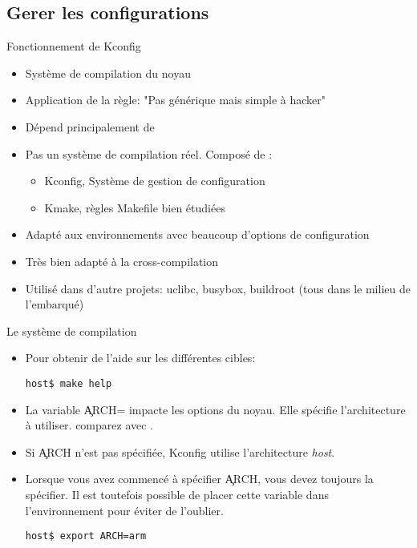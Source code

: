 \subsection{Gerer les configurations}
\begin{frame}[fragile=singleslide]{Fonctionnement de Kconfig}
  \begin{itemize}
  \item Système de compilation du noyau
  \item Application de la règle: "Pas générique mais simple à hacker"
  \item Dépend principalement de 
  \item  Pas un  système de  compilation réel. Composé de :
    \begin{itemize}
    \item Kconfig, Système de gestion de configuration
    \item Kmake, règles Makefile bien étudiées
    \end{itemize}
  \item   Adapté  aux  environnements   avec  beaucoup   d'options  de
    configuration
  \item Très bien adapté à la cross-compilation
  \item Utilisé dans d'autre projets: uclibc, busybox, buildroot (tous
    dans le milieu de l'embarqué)
\end{itemize}
\end{frame} 

\begin{frame}[fragile=singleslide]{Le système de compilation}
\begin{itemize} 
  \item Pour obtenir de l'aide sur les différentes cibles:
    \begin{lstlisting}
host$ make help
    \end{lstlisting} 
  \item  La variable  \c{ARCH=}  impacte les  options  du noyau.  Elle
    spécifie l'architecture à utiliser.  comparez  avec
    . 
  \item   Si   \c{ARCH}   n'est   pas   spécifiée,   Kconfig   utilise
    l'architecture \emph{host}.
  \item Lorsque  vous avez commencé  à spécifier \c{ARCH},  vous devez
    toujours la  spécifier. Il est toutefois possible  de placer cette
    variable dans l'environnement pour éviter de l'oublier.
    \begin{lstlisting}
host$ export ARCH=arm 
    \end{lstlisting} 
  \end{itemize} 
\end{frame} 

